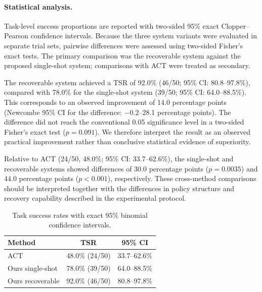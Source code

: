 
\paragraph{Statistical analysis.}
Task-level success proportions are reported with two-sided 95\% exact
Clopper--Pearson confidence intervals. Because the three system variants were
evaluated in separate trial sets, pairwise differences were assessed using
two-sided Fisher's exact tests. The primary comparison was the recoverable
system against the proposed single-shot system; comparisons with ACT were
treated as secondary.

The recoverable system achieved a TSR of 92.0\% (46/50; 95\% CI:
80.8--97.8\%), compared with 78.0\% for the single-shot system (39/50; 95\%
CI: 64.0--88.5\%). This corresponds to an observed improvement of 14.0
percentage points (Newcombe 95\% CI for the difference:
$-0.2$--28.1 percentage points). The difference did not reach the conventional
0.05 significance level in a two-sided Fisher's exact test
($p=0.091$). We therefore interpret the result as an observed practical
improvement rather than conclusive statistical evidence of superiority.

Relative to ACT (24/50, 48.0\%; 95\% CI: 33.7--62.6\%), the single-shot and
recoverable systems showed differences of 30.0 percentage points
($p=0.0035$) and 44.0 percentage points ($p<0.001$), respectively. These
cross-method comparisons should be interpreted together with the differences
in policy structure and recovery capability described in the experimental
protocol.

\begin{table}[t]
\caption{Task success rates with exact 95\% binomial confidence intervals.}
\label{tab:task_statistics}
\centering
\small
\begin{tabular}{lcc}
\hline
Method & TSR & 95\% CI \\
\hline
ACT & 48.0\% (24/50) & 33.7--62.6\% \\
Ours single-shot & 78.0\% (39/50) & 64.0--88.5\% \\
Ours recoverable & 92.0\% (46/50) & 80.8--97.8\% \\
\hline
\end{tabular}
\end{table}
